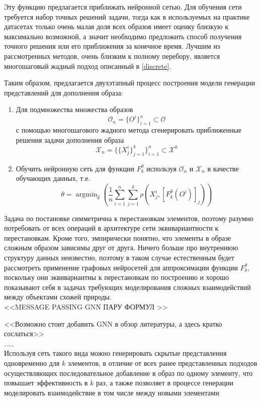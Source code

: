 \documentclass[a4paper,12pt]{article}
\DeclareMathOperator*{\argmin}{argmin}
\begin{document}
			Эту функцию предлагается приближать нейронной сетью. 
			Для обучения сети требуется набор точных решений задачи, тогда как в используемых на практике датасетах только очень малая доля всех образов имеет оценку близкую к максимально возможной, а значит необходимо предложить способ получения точного решения или его приближения за конечное время. Лучшим из рассмотренных методов, очень близким к полному перебору, является многошаговый жадный подход описанный в \ref{discrete}. 
			
			Таким образом, предлагается двухэтапный процесс построения модели генерации представлений для дополнения образа:
			\begin{enumerate}
				\item Для подмножества множества образов 
				$$\mathcal{O}_n = \{O^i\}_{i=1}^n \subset\mathcal{O}$$
				 с помощью многошагового жадного метода сгенерировать приближенные решения задачи дополнения образа $$\mathcal{X}_n =\{\{X_j^i\}_{j=1}^k\}_{i=1}^n\subset\mathcal{X}^k$$
				  
				\item Обучить нейронную сеть для функции $F_k^\theta$ используя $\mathcal{O}_n$ и $\mathcal{X}_n$ в качестве обучающих данных, т.е. 
				$$\theta = \argmin_{\hat{\theta}}\left( \frac{1}{n}\sum_{i=1}^n\sum_{j=1}^k\rho\left(X_j^i, [F_k^{\hat{\theta}}(O^i)]_j\right)\right)$$
			\end{enumerate}
		
		Задача по постановке симметрична к перестановкам элементов, поэтому разумно потребовать от всех операций в архитектуре сети эквивариантности \cite{cohen2016group} к перестановкам. Кроме того, эмпирически понятно, что элементы в образе сложным образом зависимы друг от друга.
		Ничего больше про внутреннюю структуру данных неизвестно, поэтому в таком случае естественным будет рассмотреть применение графовых нейросетей для аппроксимации функции $F_k^\theta$, поскольку они эквивариантны к перестановкам по построению и хорошо показывают себя в задачах требующих моделирования сложных взаимодействий между объектами схожей природы.\\ 
		
		<<MESSAGE PASSING GNN \cite{gilmer2017neural} ПАРУ ФОРМУЛ >>
		
		<<Возможно стоит добавить GNN в обзор литературы, а здесь кратко сослаться>>\\
		
		.....\\
		
		Используя сеть такого вида можно генерировать скрытые представления одновременно для $k$ элементов, в отличие от всех ранее представленных подходов осуществляющих последовательное добавление в образ по одному элементу, что повышает эффективность в $k$ раз, а также позволяет в процессе генерации моделировать взаимодействие в том числе между новыми элементами
		
\end{document}
